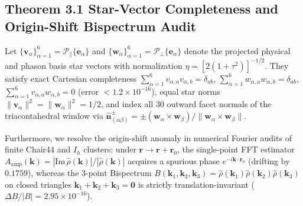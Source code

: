 \documentclass[11pt,a4paper]{article}
\theoremstyle{definition}
\begin{document}
\subsection{Theorem 3.1 Star-Vector Completeness and Origin-Shift Bispectrum Audit}
Let $\{\mathbf{v}_\alpha\}_{\alpha=1}^6 = \mathcal{P}_\parallel \{\mathbf{e}_\alpha\}$ and $\{\mathbf{w}_\alpha\}_{\alpha=1}^6 = \mathcal{P}_\perp \{\mathbf{e}_\alpha\}$ denote the projected physical and phason basis star vectors with normalization $\eta = [2(1+\tau^2)]^{-1/2}$. They satisfy exact Cartesian completeness $\sum_{\alpha=1}^6 v_{\alpha,a}v_{\alpha,b} = \delta_{ab}$, $\sum_{\alpha=1}^6 w_{\alpha,a}w_{\alpha,b} = \delta_{ab}$, $\sum_{\alpha=1}^6 v_{\alpha,a}w_{\alpha,b} = 0$ (error $< 1.2 \times 10^{-16}$), equal star norms $\|\mathbf{v}_\alpha\|^2 = \|\mathbf{w}_\alpha\|^2 = 1/2$, and index all 30 outward facet normals of the triacontahedral window via $\hat{\mathbf{n}}_{(\alpha\beta)}^\pm = \pm(\mathbf{w}_\alpha \times \mathbf{w}_\beta)/\|\mathbf{w}_\alpha \times \mathbf{w}_\beta\|$.

Furthermore, we resolve the origin-shift anomaly in numerical Fourier audits of finite Chair44 and $I_h$ clusters: under $\mathbf{r} \to \mathbf{r} + \mathbf{r}_0$, the single-point FFT estimator $A_{\mathrm{amp}}(\mathbf{k}) = |\mathrm{Im}\,\hat{\rho}(\mathbf{k})|/|\hat{\rho}(\mathbf{k})|$ acquires a spurious phase $e^{-i\mathbf{k}\cdot\mathbf{r}_0}$ (drifting by $0.1759$), whereas the 3-point Bispectrum $B(\mathbf{k}_1,\mathbf{k}_2,\mathbf{k}_3) = \hat{\rho}(\mathbf{k}_1)\hat{\rho}(\mathbf{k}_2)\hat{\rho}(\mathbf{k}_3)$ on closed triangles $\mathbf{k}_1+\mathbf{k}_2+\mathbf{k}_3=\mathbf{0}$ is strictly translation-invariant ($\Delta B / |B| = 2.95 \times 10^{-16}$).
\end{document}
